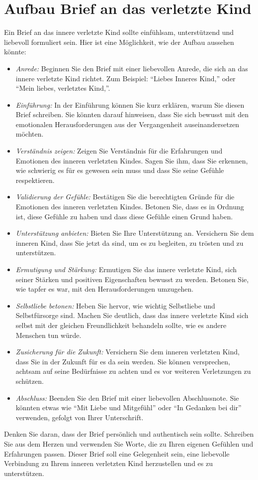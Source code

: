 \section{Aufbau Brief an das verletzte Kind}

 Ein Brief an das innere verletzte Kind sollte einfühlsam, unterstützend und liebevoll formuliert sein. Hier ist eine Möglichkeit, wie der Aufbau aussehen könnte:
\begin{itemize}
    \item \emph{Anrede:} Beginnen Sie den Brief mit einer liebevollen Anrede, die sich an das innere verletzte Kind richtet. Zum Beispiel: \enquote{Liebes Inneres Kind,} oder \enquote{Mein liebes, verletztes Kind,}.
    \item \emph{Einführung:} In der Einführung können Sie kurz erklären, warum Sie diesen Brief schreiben. Sie könnten darauf hinweisen, dass Sie sich bewusst mit den emotionalen Herausforderungen aus der Vergangenheit auseinandersetzen möchten.
    \item \emph{Verständnis zeigen:} Zeigen Sie Verständnis für die Erfahrungen und Emotionen des inneren verletzten Kindes. Sagen Sie ihm, dass Sie erkennen, wie schwierig es für es gewesen sein muss und dass Sie seine Gefühle respektieren.
    \item \emph{Validierung der Gefühle:} Bestätigen Sie die berechtigten Gründe für die Emotionen des inneren verletzten Kindes. Betonen Sie, dass es in Ordnung ist, diese Gefühle zu haben und dass diese Gefühle einen Grund haben.
    \item \emph{Unterstützung anbieten:} Bieten Sie Ihre Unterstützung an. Versichern Sie dem inneren Kind, dass Sie jetzt da sind, um es zu begleiten, zu trösten und zu unterstützen.

    \item \emph{Ermutigung und Stärkung:} Ermutigen Sie das innere verletzte Kind, sich seiner Stärken und positiven Eigenschaften bewusst zu werden. Betonen Sie, wie tapfer es war, mit den Herausforderungen umzugehen.
    \item \emph{Selbstliebe betonen:} Heben Sie hervor, wie wichtig Selbstliebe und Selbstfürsorge sind. Machen Sie deutlich, dass das innere verletzte Kind sich selbst mit der gleichen Freundlichkeit behandeln sollte, wie es andere Menschen tun würde.
    \item \emph{Zusicherung für die Zukunft:} Versichern Sie dem inneren verletzten Kind, dass Sie in der Zukunft für es da sein werden. Sie können versprechen, achtsam auf seine Bedürfnisse zu achten und es vor weiteren Verletzungen zu schützen.
    \item \emph{Abschluss:} Beenden Sie den Brief mit einer liebevollen Abschlussnote. Sie könnten etwas wie \enquote{Mit Liebe und Mitgefühl} oder \enquote{In Gedanken bei dir} verwenden, gefolgt von Ihrer Unterschrift.
\end{itemize}
%
Denken Sie daran, dass der Brief persönlich und authentisch sein sollte. Schreiben Sie aus dem Herzen und verwenden Sie Worte, die zu Ihren eigenen Gefühlen und Erfahrungen passen. Dieser Brief soll eine Gelegenheit sein, eine liebevolle Verbindung zu Ihrem inneren verletzten Kind herzustellen und es zu unterstützen.



